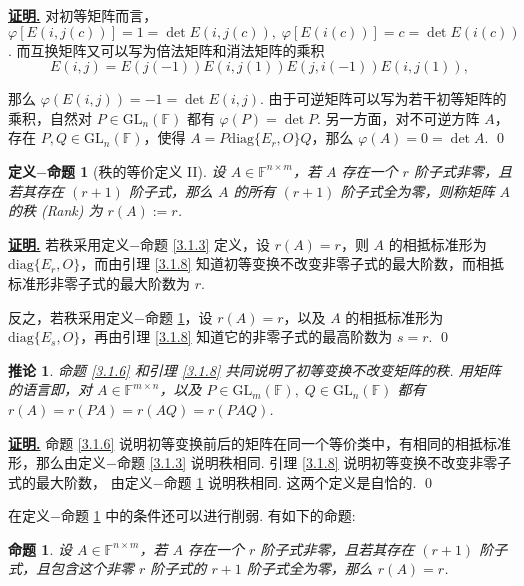 \documentclass[10pt,openany]{article}
\theoremstyle{thmstyle} %
\theoremstyle{defstyle} %
\newtheorem{defprop}[theorem]{定义\(-\)命题}
\newtheorem{corollary}[theorem]{推论}
\theoremstyle{prostyle} %
\newtheorem{proposition}[theorem]{命题}
\theoremstyle{exastyle}
\theoremstyle{remstyle}
\renewenvironment{proof}[1][证明]{\par\underline{\textbf{#1.}} \;\fangsong}{\qed\par}
\newcommand{\F}{\mathbb{F}}
\newcommand{\gfn}{\text{GL}_n(\mathbb{F})}
\newcommand{\gfm}{\text{GL}_m(\mathbb{F})}
\newcommand{\mn}{^{m \times n}}
\newcommand{\nm}{^{n \times m}}
\newcommand{\diag}{\mathrm{diag}}
\begin{document}
\begin{proof}
	对初等矩阵而言，\( \varphi[E(i,j(c))]=1=\det E(i,j(c)), \; \varphi[E(i(c))]=c=\det E(i(c)) \). 而互换矩阵又可以写为倍法矩阵和消法矩阵的乘积
	\[ E(i,j)= E(j(-1))E(i,j(1))E(j,i(-1))E(i,j(1)), \]
	
	那么 \( \varphi(E(i,j))=-1=\det E(i,j) \). 由于可逆矩阵可以写为若干初等矩阵的乘积，自然对 \( P \in \gfn \) 都有 \( \varphi(P)=\det P \). 另一方面，对不可逆方阵 \( A \)，存在 \( P,Q \in \gfn \)，使得 \( A=P\diag\{E_r,O\}Q \)，那么 \( \varphi(A)=0=\det A \).  
\end{proof}

\begin{defprop}[秩的等价定义 II] \label{3.1.9}
	设 \( A \in \F\nm \)，若 \( A \) 存在一个 \( r \) 阶子式非零，且若其存在 \( (r+1) \) 阶子式，那么 \( A \) 的所有  \( (r+1) \) 阶子式全为零，则称矩阵 \( A \) 的秩 (Rank) 为 \( r(A):=r \).
\end{defprop}

\begin{proof}
	若秩采用定义\(-\)命题 \ref{3.1.3} 定义，设 \( r(A)=r \)，则 \( A \) 的相抵标准形为 \( \diag\{E_r,O\} \)，而由引理 \ref{3.1.8} 知道初等变换不改变非零子式的最大阶数，而相抵标准形非零子式的最大阶数为 \( r \). 
	
	反之，若秩采用定义\(-\)命题 \ref{3.1.9}，设 \( r(A)=r \)，以及 \( A \) 的相抵标准形为 \( \diag\{E_s,O\} \)，再由引理 \ref{3.1.8} 知道它的非零子式的最高阶数为 \( s=r \).
\end{proof}

\begin{corollary} \label{3.1.10}
	命题 \ref{3.1.6} 和引理 \ref{3.1.8} 共同说明了初等变换不改变矩阵的秩. 用矩阵的语言即，对 \( A \in \F\mn \)，以及 \( P \in \gfm, \; Q \in \gfn \) 都有 \( r(A)=r(PA)=r(AQ)=r(PAQ) \).
\end{corollary}

\begin{proof}
	命题 \ref{3.1.6} 说明初等变换前后的矩阵在同一个等价类中，有相同的相抵标准形，那么由定义\(-\)命题 \ref{3.1.3} 说明秩相同. 引理 \ref{3.1.8} 说明初等变换不改变非零子式的最大阶数， 由定义\(-\)命题 \ref{3.1.9} 说明秩相同. 这两个定义是自恰的.
\end{proof}

在定义\(-\)命题 \ref{3.1.9} 中的条件还可以进行削弱. 有如下的命题:

\begin{proposition} \label{3.1.11}
	设 \( A \in \F\nm \)，若 \( A \) 存在一个 \( r \) 阶子式非零，且若其存在 \( (r+1) \) 阶子式，且包含这个非零 \( r \) 阶子式的 \( r+1 \) 阶子式全为零，那么 \( r(A)=r \).
\end{proposition}
\end{document}
